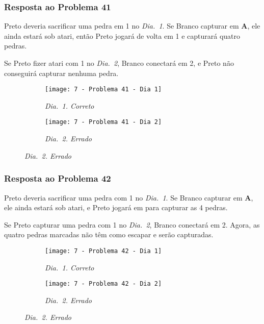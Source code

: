 \pagebreak

\subsubsection*{Resposta ao Problema 41}

Preto deveria sacrificar uma pedra em 1 no \emph{Dia.\@~1}. Se Branco capturar em \textbf{A}, ele ainda estará sob atari, então Preto jogará de volta em 1 e capturará quatro pedras.
    
Se Preto fizer atari com 1 no \emph{Dia.\@~2}, Branco conectará em 2, e Preto não conseguirá capturar nenhuma pedra.

\begin{figure}[h!]
    \centering
    \begin{subfigure}[t]{.31\textwidth}
        \texttt{[image: 7 - Problema 41 - Dia 1]}
        \caption*{\emph{Dia.\@~1. Correto}}
    \end{subfigure}
    \hspace{1cm}
    \begin{subfigure}[t]{.31\textwidth}
        \texttt{[image: 7 - Problema 41 - Dia 2]}
        \caption*{\emph{Dia.\@~2. Errado}}
    \end{subfigure}
\end{figure}

\subsubsection*{Resposta ao Problema 42}

Preto deveria sacrificar uma pedra com 1 no \emph{Dia.\@~1}. Se Branco capturar em \textbf{A}, ele ainda estará sob atari, e Preto jogará em para capturar as 4 pedras.
    
Se Preto capturar uma pedra com 1 no \emph{Dia.\@~2}, Branco conectará em 2. Agora, as quatro pedras marcadas não têm como escapar e serão capturadas.

\begin{figure}[h!]
    \centering
    \begin{subfigure}[t]{.31\textwidth}
        \texttt{[image: 7 - Problema 42 - Dia 1]}
        \caption*{\emph{Dia.\@~1. Correto}}
    \end{subfigure}
    \hspace{1cm}
    \begin{subfigure}[t]{.31\textwidth}
        \texttt{[image: 7 - Problema 42 - Dia 2]}
        \caption*{\emph{Dia.\@~2. Errado}}
    \end{subfigure}
\end{figure}

